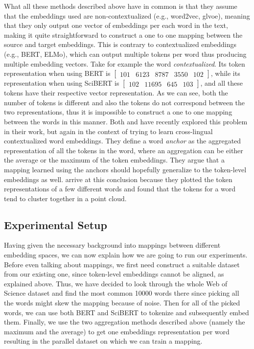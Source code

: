 \documentclass[12pt]{extreport}
\begin{document}
What all these methods described above have in common is that they assume that the embeddings used are non-contextualized (e.g., word2vec, glvoe), meaning that they only output one vector of embeddings per each word in the text, making it quite straightforward to construct a one to one mapping between the source and target embeddings. This is contrary to contextualized embeddings (e.g., BERT, ELMo), which can output multiple tokens per word thus producing multiple embedding vectors. Take for example the word \emph{contextualized}. Its token representation when using BERT is $\begin{bmatrix} 101 & 6123 & 8787 & 3550 & 102 \end{bmatrix}$, while its representation when using SciBERT is $\begin{bmatrix} 102 & 11695 & 645 & 103 \end{bmatrix}$, and all these tokens have their respective vector representation. As we can see, both the number of tokens is different and also the tokens do not correspond between the two representations, thus it is impossible to construct a one to one mapping between the words in this manner. Both \cite{crosslingual} and \cite{investigating-cross-lingual} have recently explored this problem in their work, but again in the context of trying to learn cross-lingual contextualized word embeddings. They define a word \emph{anchor} as the aggregated representation of all the tokens in the word, where an aggregation can be either the average or the maximum of the token embeddings. They argue that a mapping learned using the anchors should hopefully generalize to the token-level embeddings as well. \cite{crosslingual} arrive at this conclusion because they plotted the token representations of a few different words and found that the tokens for a word tend to cluster together in a point cloud.

\subsection{Experimental Setup}

Having given the necessary background into mappings between different embedding spaces, we can now explain how we are going to run our experiments. Before even talking about mappings, we first need construct a suitable dataset from our existing one, since token-level embeddings cannot be aligned, as explained above. Thus, we have decided to look through the whole Web of Science dataset and find the most common 10000 words there since picking all the words might skew the mapping because of noise. Then for all of the picked words, we can use both BERT and SciBERT to tokenize and subsequently embed them. Finally, we use the two aggregation methods described above (namely the maximum and the average) to get one embeddings representation per word resulting in the parallel dataset on which we can train a mapping.
\end{document}
